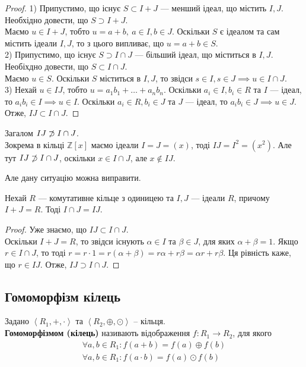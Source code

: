 \documentclass{math_library}
\begin{document}
\begin{proof}
1) Припустимо, що існує $S \subset I+J$ --- менший ідеал, що містить $I,J$. Необхідно довести, що $S \supset I+J$.\\
Маємо $u \in I+J$, тобто $u = a + b,\ a \in I, b \in J$. Оскільки $S$ є ідеалом та сам містить ідеали $I,J$, то з цього випливає, що $u = a + b \in S$.
\bigskip \\
2) Припустимо, що існує $S \supset I \cap J$ --- більший ідеал, що міститься в $I,J$. Необіхдно довести, що $S \subset I \cap J$.\\
Маємо $u \in S$. Оскільки $S$ міститься в $I,J$, то звідси $s \in I, s \in J \implies u \in I \cap J$.
\bigskip \\
3) Нехай $u \in IJ$, тобто $u = a_1b_1 + \dots + a_n b_n$. Оскільки $a_i \in I, b_i \in R$ та $I$ --- ідеал, то $a_ib_i \in I \implies u \in I$. Оскільки $a_i \in R, b_i \in J$ та $J$ --- ідеал, то $a_ib_i \in J \implies u \in J$. Отже, $IJ \subset I \cap J$. 
\end{proof}

\begin{remark}
Загалом $IJ \centernot\supset I \cap J$.
\bigskip \\
Зокрема в кільці $\mathbb{Z}[x]$ маємо ідеали $I = J = (x)$, тоді $IJ = I^2 = (x^2)$. Але тут $IJ \centernot\supset I \cap J$, оскільки $x \in I \cap J$, але $x \notin IJ$.
\end{remark}

Але дану ситуацію можна виправити.

\begin{proposition}
Нехай $R$ --- комутативне кільце з одиницею та $I,J$ --- ідеали $R$, причому $I+J = R$. Тоді $I \cap J = IJ$. 
\end{proposition}

\begin{proof}
Уже знаємо, що $IJ \subset I \cap J$.\\
Оскільки $I+J = R$, то звідси існують $\alpha \in I$ та $\beta \in J$, для яких $\alpha + \beta = 1$. Якщо $r \in I \cap J$, то тоді $r = r \cdot 1 = r(\alpha + \beta) = r \alpha + r \beta = \alpha r + r \beta$. Ця рівність каже, що $r \in IJ$. Отже, $IJ \supset I \cap J$.
\end{proof}

\subsection{Гомоморфізм кілець}
\begin{definition}
Задано $\left<R_1, +, \cdot \right>$ та $\left<R_2, \oplus, \odot \right>$ -- кільця.\\
\textbf{Гомоморфізмом (кілець)} називають відображення $f \colon R_1 \to R_2$, для якого
\begin{align*}
\forall a,b \in R_1: f(a+b) = f(a) \oplus f(b) \\
\forall a,b \in R_1: f(a \cdot b) = f(a) \odot f(b)
\end{align*}
\end{definition}
\end{document}
